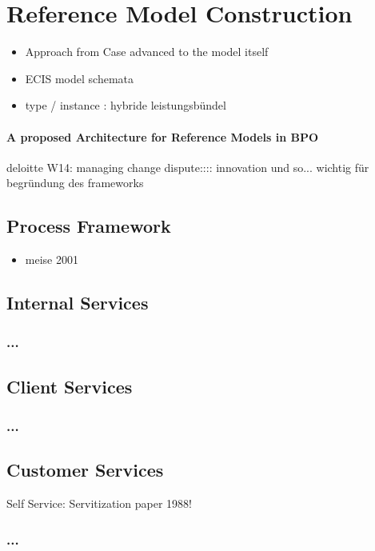 
\chapter{Reference Model Construction}
\begin{itemize}
	\item Approach from Case advanced to the model itself
	\item ECIS model schemata
	\item type / instance : hybride leistungsbündel
\end{itemize}
\subsubsection{A proposed Architecture for Reference Models in BPO}
	deloitte W14: managing change dispute:::: innovation und so... wichtig für begründung des frameworks
	\section{Process Framework}
	\begin{itemize}
		\item meise 2001
	\end{itemize}
	\section{Internal Services}
	\subsection{...}
	\section{Client Services}
	\subsection{...}
	\section{Customer Services}
	Self Service: Servitization paper 1988!
	\subsection{...}
